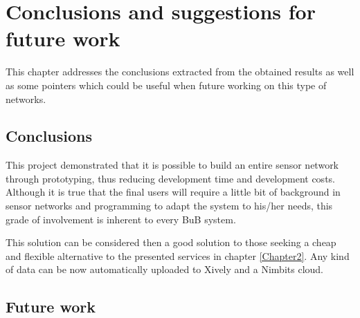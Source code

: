 
\chapter{Conclusions and suggestions for future work} %

\label{Chapter7} %



This chapter addresses the conclusions extracted from the obtained results as well as some pointers which could be useful when future working on this type of networks.



\section{Conclusions}

This project demonstrated that it is possible to build an entire sensor network through prototyping, thus reducing development time and development costs. Although it is true that the final users will require a little bit of background in sensor networks and programming to adapt the system to his/her needs, this grade of involvement is inherent to every BuB system.

This solution can be considered then a good solution to those seeking a cheap and flexible alternative to the presented services in chapter \ref{Chapter2}. Any kind of data can be now automatically uploaded to Xively and a Nimbits cloud.


\section{Future work}

